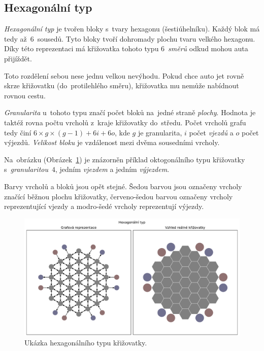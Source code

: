 \subsection{Hexagonální typ}\label{subsec:hexagonalni-typ}

\emph{Hexagonální typ} je tvořen bloky s~tvary hexagonu (šestiúhelníku).
Každý blok má tedy až~$6$~sousedů.
Tyto bloky tvoří dohromady plochu tvaru velkého hexagonu.
Díky této reprezentaci má křižovatka tohoto typu $6$~\emph{směrů} odkud mohou auta přijíždět.

Toto rozdělení sebou nese jednu velkou nevýhodu.
Pokud chce auto jet rovně skrze křižovatku (do~protilehlého směru), křižovatka mu nemůže nabídnout rovnou cestu.

\emph{Granularita} u~tohoto typu značí počet bloků na~jedné straně \emph{plochy}.
Hodnota je taktéž rovna počtu vrcholů z~kraje křižovatky do~středu.
Počet vrcholů grafu tedy činí $6 \times g \times (g-1) + 6i + 6o$,
kde $g$ je granularita, $i$ počet \emph{vjezdů} a $o$ počet výjezdů.
\emph{Velikost bloku} je vzdálenost mezi dvěma sousedními vrcholy.

Na~obrázku (Obrázek~\ref{fig:hexagonal_type_graph}) je znázorněn příklad oktogonálního typu křižovatky s~\emph{granularitou}~$4$,
jedním \emph{vjezdem} a jedním \emph{výjezdem}.

Barvy vrcholů a bloků jsou opět stejné.
Šedou barvou jsou označeny vrcholy značící běžnou plochu křižovatky,
červeno-šedou barvou označeny vrcholy reprezentující vjezdy a modro-šedé vrcholy reprezentují výjezdy.

\begin{figure}[h]
	\centering
	\includegraphics[width=\textwidth]{../img/Hexagonal_grid}
	\caption{Ukázka hexagonálního typu křižovatky.}
	\label{fig:hexagonal_type_graph}
\end{figure}
